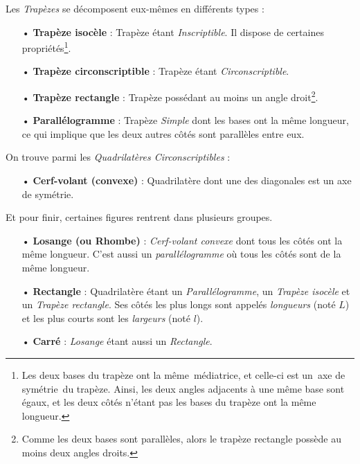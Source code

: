 \documentclass[a4paper, twoside]{article}
\begin{document}
Les \emph{Trapèzes} se décomposent eux-mêmes en différents types :

\begin{itemize}
	\item[•] \textbf{Trapèze isocèle} : Trapèze étant \textit{Inscriptible}. Il dispose de certaines propriétés\footnote{
		      Les deux bases du trapèze ont la même médiatrice, et celle-ci est un axe de symétrie du trapèze.
		      Ainsi, les deux angles adjacents à une même base sont égaux,
		      et les deux côtés n'étant pas les bases du trapèze ont la même longueur.
	      }.

	\item[•] \textbf{Trapèze circonscriptible} : Trapèze étant \textit{Circonscriptible}.
	\item[•] \textbf{Trapèze rectangle} : Trapèze possédant au moins un angle droit\footnote{Comme
		      les deux bases sont parallèles,
		      alors le trapèze rectangle possède au moins deux angles droits.}.
	\item[•] \textbf{Parallélogramme} : Trapèze \textit{Simple} dont les bases ont la même longueur,
	      ce qui implique que les deux autres côtés sont parallèles entre eux.
\end{itemize}

\bigbreak

On trouve parmi les \emph{Quadrilatères Circonscriptibles} :

\begin{itemize}
	\item[•] \textbf{Cerf-volant (convexe)} : Quadrilatère dont une des diagonales est un axe de symétrie.
\end{itemize}

\bigbreak

Et pour finir, certaines figures rentrent dans plusieurs groupes.

\begin{itemize}
	\item[•] \textbf{Losange (ou Rhombe)} : \textit{Cerf-volant convexe} dont tous les côtés ont la même longueur. C'est aussi un \textit{parallélogramme} où tous les côtés sont de la même longueur.
	\item[•] \textbf{Rectangle} : Quadrilatère étant un \textit{Parallélogramme}, un \textit{Trapèze isocèle} et un \textit{Trapèze rectangle}.
	      Ses côtés les plus longs sont appelés \emph{longueurs} (noté $L$) et les plus courts sont les \emph{largeurs} (noté $l$).
	\item[•] \textbf{Carré} : \textit{Losange} étant aussi un \textit{Rectangle}.
\end{itemize}
\end{document}
